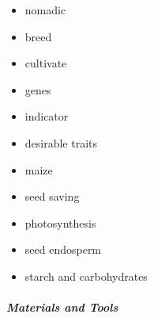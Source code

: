 \documentclass[12pt,]{article}
\providecommand{\tightlist}{%
  \setlength{\itemsep}{0pt}\setlength{\parskip}{0pt}}
\let\oldsubparagraph\subparagraph
\renewcommand{\subparagraph}[1]{\oldsubparagraph{#1}\mbox{}}
\begin{document}
\begin{itemize}
\tightlist
\item
  nomadic
\item
  breed
\item
  cultivate
\item
  genes
\item
  indicator
\item
  desirable traits
\item
  maize
\item
  seed saving
\item
  photosynthesis
\item
  seed endosperm
\item
  starch and carbohydrates
\end{itemize}

\hypertarget{materials-and-tools-2}{%
\subparagraph{Materials and Tools}\label{materials-and-tools-2}}
\end{document}
